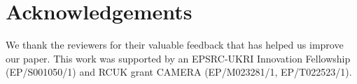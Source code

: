 \section*{Acknowledgements}

We thank the reviewers for their valuable feedback that has helped us improve our paper.
This work was supported by an EPSRC-UKRI Innovation Fellowship (EP/S001050/1) and RCUK grant CAMERA (EP/M023281/1, EP/T022523/1).

